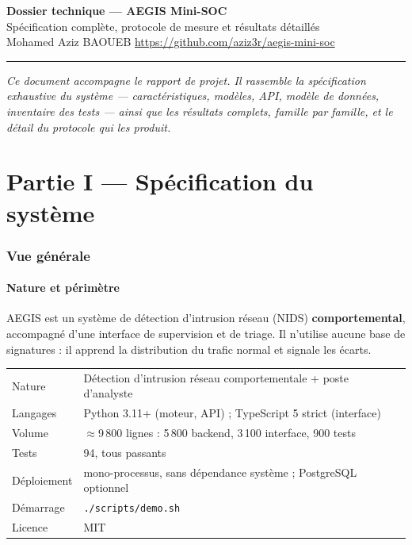 \documentclass[11pt,a4paper]{article}
\begin{document}
\begin{center}
{\LARGE\bfseries Dossier technique --- AEGIS Mini-SOC}\\[3pt]
{\large Spécification complète, protocole de mesure et résultats détaillés}\\[6pt]
{\small Mohamed Aziz BAOUEB \quad\textbullet\quad \url{https://github.com/aziz3r/aegis-mini-soc}}
\end{center}
\rule{\linewidth}{0.8pt}

\small
\textit{Ce document accompagne le rapport de projet. Il rassemble la spécification exhaustive du
système --- caractéristiques, modèles, API, modèle de données, inventaire des tests --- ainsi que
les résultats complets, famille par famille, et le détail du protocole qui les produit.}
\normalsize

\tableofcontents
\clearpage

\part*{Partie I --- Spécification du système}

\section{Vue générale}

\subsection{Nature et périmètre}

AEGIS est un système de détection d'intrusion réseau (NIDS) \textbf{comportemental}, accompagné
d'une interface de supervision et de triage. Il n'utilise aucune base de signatures : il apprend la
distribution du trafic normal et signale les écarts.

\begin{table}[h]\centering\small
\begin{tabularx}{\linewidth}{@{}l X@{}}
\toprule
Nature & Détection d'intrusion réseau comportementale + poste d'analyste \\
Langages & Python 3.11+ (moteur, API) ; TypeScript 5 strict (interface) \\
Volume & $\approx$9\,800 lignes : 5\,800 backend, 3\,100 interface, 900 tests \\
Tests & 94, tous passants \\
Déploiement & mono-processus, sans dépendance système ; PostgreSQL optionnel \\
Démarrage & \texttt{./scripts/demo.sh} \\
Licence & MIT \\
\bottomrule
\end{tabularx}
\end{table}
\end{document}
